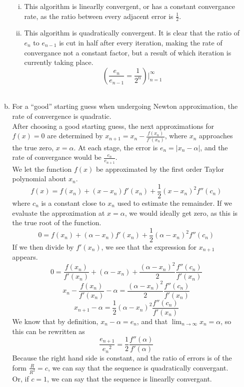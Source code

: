 \documentclass[11pt]{article}
\begin{document}
\begin{enumerate}
\begin{enumerate}[(a)]
		\begin{enumerate}[i.]

			\item This algorithm is linearlly convergent, or has a constant convergance rate, as the ratio between every adjacent
			error is $\frac{1}{2}$.

			\item This algorithm is quadratically convergent. It is clear that the ratio of $e_n$ to $e_{n-1}$ is cut in half
			after every iteration, making the rate of convergance not a constant factor, but a result of which iteration is
			currently taking place.
			$$(\frac{e_n}{e_{n-1}} = \frac{1}{2^n})|_{n=1}^{\infty}$$ \\

		\end{enumerate}

		\item For a ``good'' starting guess when undergoing Newton approximation, the rate of convergence is quadratic. \\

			After choosing a good starting guess, the next approximations for $f(x)=0$ are determined by $x_{n+1} = x_n-\frac{f(x_n)}{f'(x_n)}$, where
			$x_n$ approaches the true zero, $x=\alpha$. At each stage, the error is $e_n = |x_n-\alpha|$, and the rate of convergance would be
			$\frac{e_n}{e_{n+1}}$. \\

			We let the function $f(x)$ be approximated by the first order Taylor polynomial about $x_n$.
			$$f(x) = f(x_n) + (x-x_n)f'(x_n) + \frac{1}{2} (x-x_n)^2f''(c_n)$$
			where $c_n$ is a constant close to $x_n$ used to estimate the remainder. If we evaluate the approximation at $x=\alpha$, we would ideally get zero,
			as this is the true root of the function.
			$$0 = f(x_n) + (\alpha - x_n)f'(x_n) + \frac{1}{2} (\alpha-x_n)^2f''(c_n)$$
			If we then divide by $f'(x_n)$, we see that the expression for $x_{n+1}$ appears.
			$$0 = \frac{f(x_n)}{f'(x_n)}+(\alpha-x_n) + \frac{(\alpha-x_n)^2}{2} \frac{f''(c_n)}{f'(x_n)} $$
			$$x_n - \frac{f(x_n)}{f'(x_n)} - \alpha = \frac{(\alpha-x_n)^2}{2} \frac{f''(c_n)}{f'(x_n)} $$
			$$x_{n+1}-\alpha = \frac{1}{2} (\alpha - x_n)^2 \frac{f''(c_n)}{f'(x_n)} $$
			We know that by definition, $x_n-\alpha = e_n$, and that $\lim_{n\to\infty}x_n = \alpha$,  so this can be rewritten as
			$$\frac{e_{n+1}}{{e_n}^2} = \frac{1}{2}\frac{f''(\alpha)}{f'(\alpha)} $$
			Because the right hand side is constant, and the ratio of errors is of the form $\frac{R}{R^2} = c$, we can say that the sequence is
			quadratically convergant. Or, if $c= 1$, we can say that the sequence is linearlly convergant. \\


\end{enumerate}
\end{enumerate}
\end{document}
